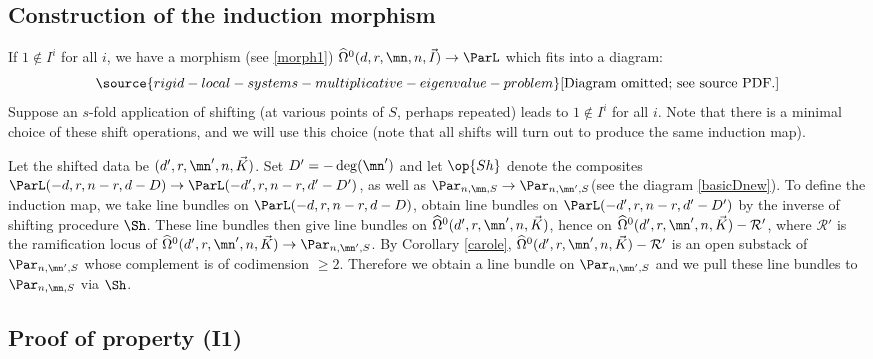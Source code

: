 \subsection{Construction of the induction morphism}
If $1\not\in I^i$ for all $i$, we have a morphism  (see \eqref{morph1}) $\widehat{\Omega}^0(d,r,\mn,n,\vec{I})\to \ParL$ which fits into a diagram:
\begin{equation}\label{Dbasic1.5}
\source{rigid-local-systems-multiplicative-eigenvalue-problem}
\text{[Diagram omitted; see source PDF.]}
\end{equation}
Suppose an $s$-fold application of shifting (at various points of $S$, perhaps repeated) leads to $1\not\in I^i$ for all $i$. Note that there is a minimal choice of these shift operations, and we will use this choice (note that all shifts will turn out to produce the same induction map).

Let the shifted data be $(d',r,\mn',n,\vec{K})$. Set $D'=-\deg(\mn')$ and let $\op{Sh}$ denote the composites $\ParL(-d,r,n-r,d-D)\to \ParL(-d',r,n-r,d'-D')$, as well as $\Par_{n,\mn,S}\to \Par_{n,\mn',S}$(see the diagram \eqref{basicDnew}). To define the induction map, we take line bundles on  $\ParL(-d,r,n-r,d-D)$, obtain line bundles on $\ParL(-d',r,n-r,d'-D')$ by the inverse of shifting procedure $\Sh$. These line bundles then give line bundles on $\widehat{\Omega}^0(d',r,\mn',n,\vec{K})$, hence on $\widehat{\Omega}^0(d',r,\mn',n,\vec{K})-\mathcal{R}'$, where $\mathcal{R}'$ is the ramification locus of $\widehat{\Omega}^0(d',r,\mn',n,\vec{K})\to \Par_{n,\mn',S}$. By Corollary \ref{carole}, $\widehat{\Omega}^0(d',r,\mn',n,\vec{K})-\mathcal{R}'$ is an open substack of $\Par_{n,\mn',S}$ whose complement is of codimension $\geq 2$. Therefore we obtain a line bundle on
$\Par_{n,\mn',S}$  and we pull these line bundles to $\Par_{n,\mn,S}$ via $\Sh$.
\subsection{Proof of property (I1)}

